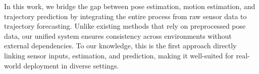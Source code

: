 In this work, we bridge the gap between pose estimation, motion estimation, and trajectory prediction by integrating the entire process from raw sensor data to trajectory forecasting. Unlike existing methods that rely on preprocessed pose data, our unified system ensures consistency across environments without external dependencies. To our knowledge, this is the first approach directly linking sensor inputs, estimation, and prediction, making it well-suited for real-world deployment in diverse settings.